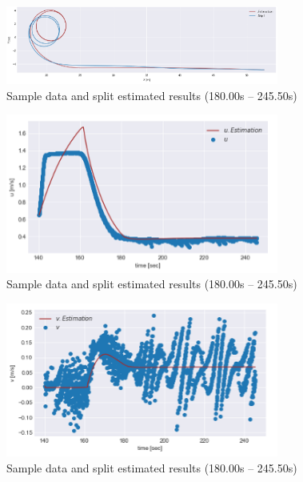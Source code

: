 \begin{figure}[htbp]
    \centering   
    \includegraphics[width=0.8\textwidth]{./img/5-4.png}
    \caption{Sample data and split estimated results (180.00s – 245.50s)}
    \label{fig:5-4_png}
\end{figure}

\begin{figure}[htbp]
    \centering   
    \includegraphics[width=0.8\textwidth]{./img/5-5.png}
    \caption{Sample data and split estimated results (180.00s – 245.50s)}
    \label{fig:5-5_png}
\end{figure}

\begin{figure}[htbp]
    \centering   
    \includegraphics[width=0.8\textwidth]{./img/5-6.png}
    \caption{Sample data and split estimated results (180.00s – 245.50s)}
    \label{fig:5-6_png}
\end{figure}

